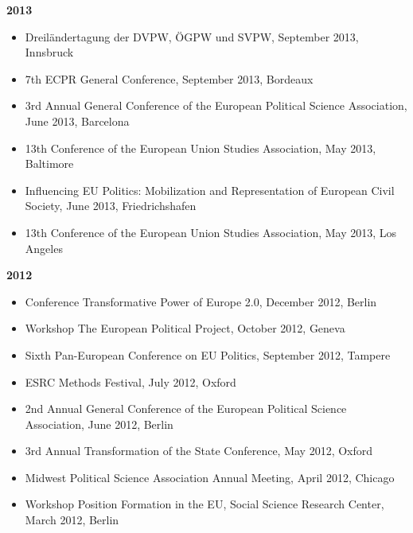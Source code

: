 \textbf{2013}
\begin{itemize}[topsep=0pt, noitemsep, leftmargin=3]
	\item Dreiländertagung der DVPW, ÖGPW und SVPW, September 2013, Innsbruck
	\item 7th ECPR General Conference, September 2013, Bordeaux
	\item 3rd Annual General Conference of the European Political Science Association, June 2013, Barcelona
	\item 13th Conference of the European Union Studies Association, May 2013, Baltimore
	\item Influencing EU Politics: Mobilization and Representation of European Civil Society, June 2013, Friedrichshafen
	\item 13th Conference of the European Union Studies Association, May 2013, Los Angeles
\end{itemize}

\vspace{\baselineskip}

\textbf{2012}
\begin{itemize}[topsep=0pt, noitemsep, leftmargin=3]
	\item Conference Transformative Power of Europe 2.0, December 2012, Berlin
	\item Workshop The European Political Project, October 2012, Geneva
	\item Sixth Pan-European Conference on EU Politics, September 2012, Tampere
	\item ESRC Methods Festival, July 2012, Oxford
	\item 2nd Annual General Conference of the European Political Science Association, June 2012, Berlin
	\item 3rd Annual Transformation of the State Conference, May 2012, Oxford 
	\item Midwest Political Science Association Annual Meeting, April 2012, Chicago
	\item Workshop Position Formation in the EU, Social Science Research Center, March 2012, Berlin
\end{itemize}

\vspace{\baselineskip}

